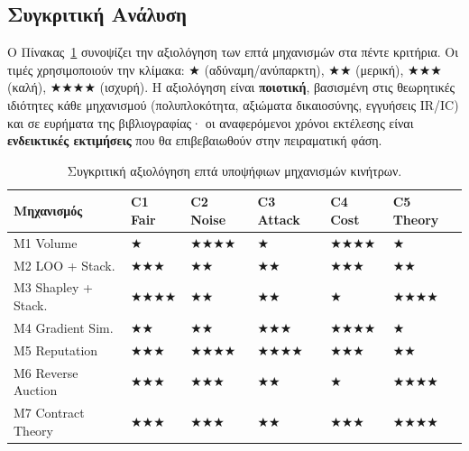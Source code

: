 \subsection{Συγκριτική Ανάλυση}
\label{subsec:inc_comparison}

Ο Πίνακας~\ref{tab:inc_comparison} συνοψίζει την αξιολόγηση των επτά μηχανισμών στα πέντε κριτήρια.
Οι τιμές χρησιμοποιούν την κλίμακα: $\bigstar$ (αδύναμη/ανύπαρκτη), $\bigstar\bigstar$ (μερική),
$\bigstar\bigstar\bigstar$ (καλή), $\bigstar\bigstar\bigstar\bigstar$ (ισχυρή). Η αξιολόγηση είναι
\textbf{ποιοτική}, βασισμένη στις θεωρητικές ιδιότητες κάθε μηχανισμού (πολυπλοκότητα, αξιώματα
δικαιοσύνης, εγγυήσεις IR/IC) και σε ευρήματα της βιβλιογραφίας· οι αναφερόμενοι χρόνοι εκτέλεσης
είναι \textbf{ενδεικτικές εκτιμήσεις} που θα επιβεβαιωθούν στην πειραματική φάση.

\begin{table}[H]
    \centering
    \caption{Συγκριτική αξιολόγηση επτά υποψήφιων μηχανισμών κινήτρων.}
    \label{tab:inc_comparison}
    \footnotesize
    \begin{tabular}{p{2.8cm} p{1.6cm} p{1.7cm} p{1.7cm} p{1.7cm} p{1.7cm}}
        \toprule
        \textbf{Μηχανισμός} & \textbf{C1 Fair} & \textbf{C2 Noise} & \textbf{C3 Attack} & \textbf{C4 Cost} & \textbf{C5 Theory} \\
        \midrule
        M1 Volume          & $\bigstar$        & $\bigstar\bigstar\bigstar\bigstar$ & $\bigstar$        & $\bigstar\bigstar\bigstar\bigstar$ & $\bigstar$ \\
        M2 LOO + Stack.    & $\bigstar\bigstar\bigstar$ & $\bigstar\bigstar$  & $\bigstar\bigstar$ & $\bigstar\bigstar\bigstar$ & $\bigstar\bigstar$ \\
        M3 Shapley + Stack.& $\bigstar\bigstar\bigstar\bigstar$ & $\bigstar\bigstar$  & $\bigstar\bigstar$ & $\bigstar$  & $\bigstar\bigstar\bigstar\bigstar$ \\
        M4 Gradient Sim.   & $\bigstar\bigstar$ & $\bigstar\bigstar$  & $\bigstar\bigstar\bigstar$ & $\bigstar\bigstar\bigstar\bigstar$ & $\bigstar$ \\
        M5 Reputation      & $\bigstar\bigstar\bigstar$ & $\bigstar\bigstar\bigstar\bigstar$ & $\bigstar\bigstar\bigstar\bigstar$ & $\bigstar\bigstar\bigstar$ & $\bigstar\bigstar$ \\
        M6 Reverse Auction & $\bigstar\bigstar\bigstar$ & $\bigstar\bigstar\bigstar$ & $\bigstar\bigstar$ & $\bigstar$         & $\bigstar\bigstar\bigstar\bigstar$ \\
        M7 Contract Theory & $\bigstar\bigstar\bigstar$ & $\bigstar\bigstar\bigstar$ & $\bigstar\bigstar$ & $\bigstar\bigstar\bigstar$ & $\bigstar\bigstar\bigstar\bigstar$ \\
        \bottomrule
    \end{tabular}
\end{table}

